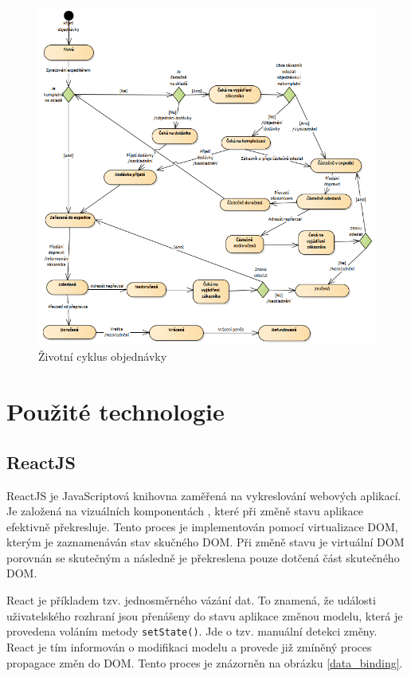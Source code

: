 \documentclass[thesis=B,czech]{FITthesis}[2012/06/26]
\begin{document}
\begin{figure}
	\includegraphics[width=\textwidth]{order_cycle.png}
	\caption{Životní cyklus objednávky}\label{oredr_cycle}
\end{figure}


\section{Použité technologie}

\subsection{ReactJS}
	ReactJS je JavaScriptová knihovna zaměřená na vykreslování webových aplikací. Je založená na vizuálních komponentách \cite{reactjs}, které při změně stavu aplikace efektivně překresluje. Tento proces je implementován pomocí virtualizace DOM, kterým je zaznamenáván stav skučného DOM. Při změně stavu je virtuální DOM porovnán se skutečným a následně je překreslena pouze dotčená část skutečného DOM. \cite{react-crud-app}

	React je příkladem tzv. jednosměrného vázání dat. To znamená, že události uživatelského rozhraní jsou přenášeny do stavu aplikace   změnou modelu, která je provedena voláním metody \verb|setState()|. Jde o tzv. manuální detekci změny. React je tím informován o modifikaci modelu a provede již zmíněný proces propagace změn do DOM.\cite{data_binding} Tento proces je znázorněn na obrázku \ref{data_binding}.
\end{document}
